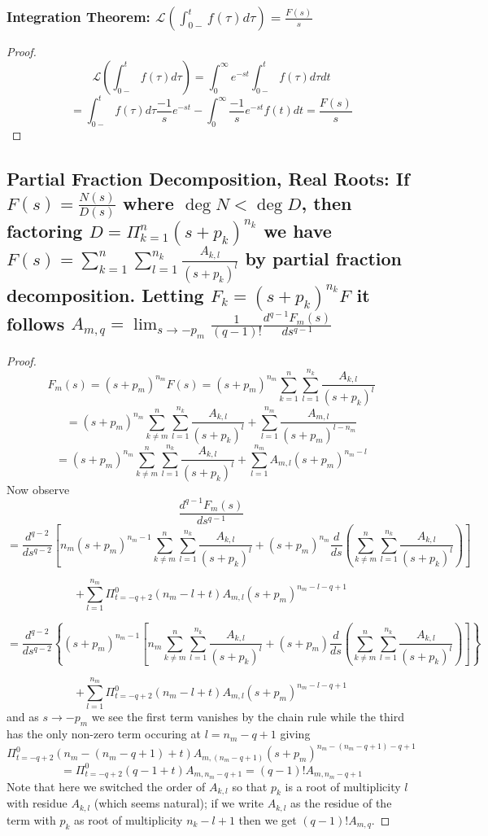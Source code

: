 \documentclass[11pt]{article}
\begin{document}
\subsubsection{Integration Theorem: $\mathcal{L}(\int_{0-}^t f(\tau) d\tau ) = \frac{F(s)}{s}$}
\begin{proof}
	\[\mathcal{L}(\int_{0-}^t f(\tau) d\tau ) =  \int_0^{\infty} e^{-st} \int_{0-}^t f(\tau) d\tau dt\]
	\[= \int_{0-}^t f(\tau) d\tau \frac{-1}{s} e^{-st} - \int_0^{\infty}\frac{-1}{s} e^{-st} f(t) dt = \frac{F(s)}{s}\]
\end{proof}

\subsection{Partial Fraction Decomposition, Real Roots: If $F(s) = \frac{N(s)}{D(s)}$ where $\deg N < \deg D$, then factoring $D = \Pi_{k = 1}^n (s + p_k)^{n_k}$ we have $F(s) = \sum_{k = 1}^n \sum_{l = 1}^{n_k} \frac{A_{k, l}}{(s + p_k)^l}$ by partial fraction decomposition. Letting $F_k = (s + p_k)^{n_k}F$ it follows $A_{m, q} = \lim_{s \to -p_m}\frac{1}{(q - 1)!} \frac{d^{q - 1}F_m(s)}{ds^{q - 1}} $}

\begin{proof}
	\[F_{m}(s) = (s + p_m)^{n_m}F(s) = (s + p_m)^{n_m} \sum_{k = 1}^n \sum_{l = 1}^{n_k} \frac{A_{k, l}}{(s + p_k)^l}\]
	\[=  (s + p_m)^{n_m}\sum_{k \neq m }^n \sum_{l = 1}^{n_k} \frac{A_{k, l}}{(s + p_k)^l} +  \sum_{l = 1}^{n_m} \frac{A_{m, l}}{(s + p_m)^{l - n_m}} \]
	\[=  (s + p_m)^{n_m}\sum_{k \neq m }^n \sum_{l = 1}^{n_k} \frac{A_{k, l}}{(s + p_k)^l} +  \sum_{l = 1}^{n_m} A_{m, l} (s + p_m)^{n_m - l}\]
	Now observe
	\[\frac{d^{q - 1}F_m(s)}{ds^{q - 1}} \]\[= \frac{d^{q - 2}}{ds^{q - 2}}\left[n_m(s + p_m)^{n_m  - 1}\sum_{k \neq m }^n \sum_{l = 1}^{n_k} \frac{A_{k, l}}{(s + p_k)^l} +  (s + p_m)^{n_m} \frac{d}{ds}\left(\sum_{k \neq m }^n \sum_{l = 1}^{n_k} \frac{A_{k, l}}{(s + p_k)^l}\right)\right]\]
	

	\[+  \sum_{l = 1}^{n_m} \Pi_{t = -q + 2}^{0}(n_m - l + t) A_{m, l} (s + p_m)^{n_m - l - q + 1}\]
	
	\[= \frac{d^{q - 2}}{ds^{q - 2}}\left\lbrace (s + p_m)^{n_m  - 1} \left[ n_m \sum_{k \neq m }^n \sum_{l = 1}^{n_k} \frac{A_{k, l}}{(s + p_k)^l}  +  (s + p_m) \frac{d}{ds}\left(\sum_{k \neq m }^n \sum_{l = 1}^{n_k} \frac{A_{k, l}}{(s + p_k)^l}\right)\right] \right\rbrace\]
	
	
	\[+  \sum_{l = 1}^{n_m} \Pi_{t = -q + 2}^{0}(n_m - l + t) A_{m, l} (s + p_m)^{n_m - l - q + 1}\]
	and as $s \to -p_m$ we see the first term vanishes by the chain rule while the third has the only non-zero term occuring at $l = n_m - q + 1$ giving
	\[ \Pi_{t = -q + 2}^{0}(n_m - (n_m - q + 1) + t) A_{m, (n_m - q + 1)} (s + p_m)^{n_m - (n_m - q + 1) - q + 1}\] 
	\[ = \Pi_{t = -q + 2}^{0}(q - 1+ t) A_{m, n_m - q + 1} = (q - 1)!A_{m, n_m - q + 1}  \] 
	Note that here we switched the order of $A_{k, l}$ so that $p_k$ is a root of multiplicity $l$ with residue $A_{k, l}$ (which seems natural); if we write $A_{k, l}$ as the residue of the term with $p_k$ as root of multiplicity $n_k - l + 1$ then we get $ (q - 1)!A_{m, q}$. 
	
\end{proof}
\end{document}
